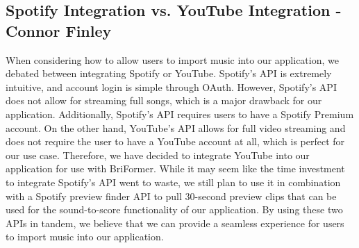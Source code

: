 \documentclass[12pt, letterpaper]{article}
\begin{document}
\subsection*{Spotify Integration vs. YouTube Integration - Connor Finley}
When considering how to allow users to import music into our application, we debated between integrating Spotify or YouTube. Spotify's API is extremely intuitive, and account login is simple through OAuth.  However, Spotify's API does not allow for streaming full songs, which is a major drawback for our application. Additionally, Spotify’s API requires users to have a Spotify Premium account. On the other hand, YouTube's API allows for full video streaming and does not require the user to have a YouTube account at all, which is perfect for our use case. Therefore, we have decided to integrate YouTube into our application for use with BriFormer.  While it may seem like the time investment to integrate Spotify's API went to waste, we still plan to use it in combination with a Spotify preview finder API to pull 30-second preview clips that can be used for the sound-to-score functionality of our application.  By using these two APIs in tandem, we believe that we can provide a seamless experience for users to import music into our application.
\end{document}
